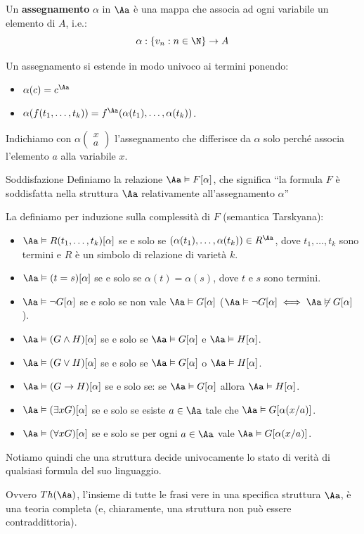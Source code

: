 \documentclass[a4paper,11pt]{report}
\newcommand{\ass}[2]{%
    \left( \begin{smallmatrix} #1 \\ #2 \end{smallmatrix} \right)
}
\begin{document}
Un \textbf{assegnamento} \( \alpha \) in \( \Aa \) è una mappa che associa ad ogni variabile un elemento di \( A \), i.e.:
\[ \alpha : \{v_n : n \in \N \} \to A\]

Un assegnamento si estende in modo univoco ai termini ponendo:
\begin{itemize}
    \item \( \alpha(c) = c^{\Aa} \) 
    \item \( \alpha(f(t_1, \dots, t_k)) = f^{\Aa}(\alpha(t_1), \dots, \alpha(t_k))\).
\end{itemize}

\begin{gframe}{}
    Indichiamo con \( \alpha\ass{x}{a} \) l'assegnamento che differisce da \( \alpha \) solo perché associa l'elemento \( a \) alla variabile \( x \).
\end{gframe}

\begin{defframe}{Soddisfazione}{}
    Definiamo la relazione \( \Aa \vDash F[\alpha] \), che significa ``la formula \( F \) è soddisfatta nella struttura \( \Aa \) relativamente all'assegnamento \( \alpha \)''

    La definiamo per induzione sulla complessità di \( F \) (semantica Tarskyana):

    \begin{itemize}
    \item $\Aa \vDash R(t_1, \dots, t_k)[\alpha]$ se e solo se $(\alpha(t_1), \dots, \alpha(t_k)) \in R^{\Aa}$, dove $t_1, \dots, t_k$ sono termini e $R$ è un simbolo di relazione di varietà $k$.
    \item $\Aa \vDash (t = s)[\alpha]$ se e solo se $\alpha(t) = \alpha(s)$, dove $t$ e $s$ sono termini.
    \item $\Aa \vDash \neg G[\alpha]$ se e solo se non vale $\Aa \vDash G[\alpha]$ {\color{gray}\small(\( \Aa \vDash \neg G[\alpha] \iff \Aa \not\vDash G[\alpha]\))}.
    \item $\Aa \vDash (G \land H)[\alpha]$ se e solo se $\Aa \vDash G[\alpha]$ e $\Aa \vDash H[\alpha]$.
    \item $\Aa \vDash (G \lor H)[\alpha]$ se e solo se $\Aa \vDash G[\alpha]$ o $\Aa \vDash H[\alpha]$.
    \item $\Aa \vDash (G \to H)[\alpha]$ se e solo se: se $\Aa \vDash G[\alpha]$ allora $\Aa \vDash H[\alpha]$.
    \item $\Aa \vDash (\exists x G)[\alpha]$ se e solo se esiste $a \in \Aa$ tale che $\Aa \vDash G[\alpha(x/a)]$.
    \item $\Aa \vDash (\forall x G)[\alpha]$ se e solo se per ogni $a \in \Aa$ vale $\Aa \vDash G[\alpha(x/a)]$.
\end{itemize}

\begin{gframe}{}
    Notiamo quindi che una struttura decide univocamente lo stato di verità di qualsiasi formula del suo linguaggio.

    Ovvero \( Th(\Aa) \), l'insieme di tutte le frasi vere in una specifica struttura \(\Aa\), è una teoria completa (e, chiaramente, una struttura non può essere contraddittoria).
\end{gframe}
\end{defframe}
\end{document}
